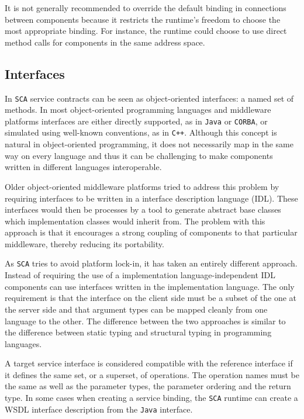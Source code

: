 It is not generally recommended to override the default binding in connections between components because it restricts
the runtime's freedom to choose the most appropriate binding. For instance, the runtime could choose to use direct method
calls for components in the same address space.

\subsection{Interfaces}
In \texttt{SCA} service contracts can be seen as object-oriented interfaces: a named set of methods. In most object-oriented programming
languages and middleware platforms interfaces are either directly supported, as in \texttt{Java} or \texttt{CORBA}, or simulated using well-known
conventions, as in \texttt{C++}. Although this concept is natural in object-oriented programming, it does not necessarily map in the same
way on every language and thus it can be challenging to make components written in different languages interoperable.

Older object-oriented middleware platforms tried to address this problem by requiring interfaces to be written in a
interface description language (IDL). These interfaces would then be processes by a tool to generate abstract base classes
which implementation classes would inherit from. The problem with this approach is that it encourages a strong coupling
of components to that particular middleware, thereby reducing its portability.

As \texttt{SCA} tries to avoid platform lock-in, it has taken an entirely different approach. Instead of requiring the use
of a implementation language-independent IDL components can use interfaces written in the implementation language.
The only requirement is that the interface on the client side must be a subset of the one at the server side and that
argument types can be mapped cleanly from one language to the other. The difference between the two approaches is
similar to the difference between static typing and structural typing in programming languages.

A target service interface is considered compatible with the reference interface if it defines the same set, or a superset,
of operations. The operation names must be the same as well as the parameter types, the parameter ordering and the return
type.
In some cases when creating a service binding, the \texttt{SCA} runtime can create a WSDL interface description from the \texttt{Java} interface.


